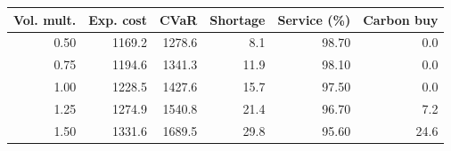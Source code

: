 \begin{tabular}{rrrrrr}
\toprule
Vol. mult. & Exp. cost & CVaR & Shortage & Service (\%) & Carbon buy \\
\midrule
0.50 & 1169.2 & 1278.6 & 8.1 & 98.70 & 0.0 \\
0.75 & 1194.6 & 1341.3 & 11.9 & 98.10 & 0.0 \\
1.00 & 1228.5 & 1427.6 & 15.7 & 97.50 & 0.0 \\
1.25 & 1274.9 & 1540.8 & 21.4 & 96.70 & 7.2 \\
1.50 & 1331.6 & 1689.5 & 29.8 & 95.60 & 24.6 \\
\bottomrule
\end{tabular}
